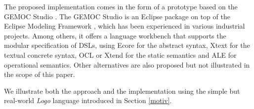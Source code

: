 The proposed implementation comes in the form of a prototype based on the GEMOC Studio \cite{bousse:hal-01355391}. The GEMOC Studio is an Eclipse package on top of the Eclipse Modeling Framework \cite{steinberg2008emf}, which has been experienced in various industrial projects. Among others, it offers a language workbench that supports the modular specification of DSLs, using Ecore for the abstract syntax, Xtext for the textual concrete syntax, OCL or Xtend for the static semantics and ALE for operational semantics. Other alternatives are also proposed but not illustrated in the scope of this paper. 

We illustrate both the approach and the implementation using the simple but real-world \emph{Logo} language introduced in Section \ref{motiv}. 

